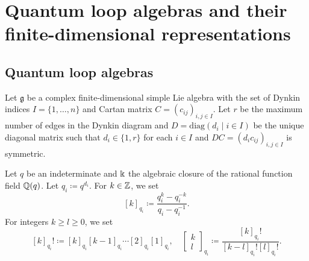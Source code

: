 \section{Quantum loop algebras and their finite-dimensional representations}
\label{Sec : qloop}

\subsection{Quantum loop algebras}
\label{ssec : quantum loop algebras}

Let $\mathfrak{g}$ be a complex finite-dimensional simple Lie algebra
with the set of Dynkin indices $I = \{1, \ldots, n\}$
and Cartan matrix $C = (c_{ij})_{i, j \in I}$.
Let $r$ be the maximum number of edges in the Dynkin diagram
and $D = \mathrm{diag}(d_i \mid i \in I)$ be the unique diagonal matrix
such that $d_i \in \{1, r\}$ for each $i \in I$
and $DC = (d_i c_{ij})_{i, j \in I}$ is symmetric.

Let $q$ be an indeterminate and $\Bbbk$
the algebraic closure of the rational function field $\mathbb{Q}(q)$.
Let $q_i \coloneq q^{d_i}$.
For $k \in \mathbb{Z}$, we set 
\[
[k]_{q_i} \coloneq \frac{q_i^k - q_i^{-k}}{q_i - q_i^{-1}}. 
\]
For integers $k \geq l \geq 0$, we set
\[
[k]_{q_i}! \coloneq [k]_{q_i}[k - 1]_{q_i}\cdots [2]_{q_i}[1]_{q_i},
\quad
\left[\begin{matrix} k \\ l \end{matrix}\right]_{q_i}
\coloneq \frac{[k]_{q_i}!}{[k - l]_{q_i}! [l]_{q_i}!}.
\]

